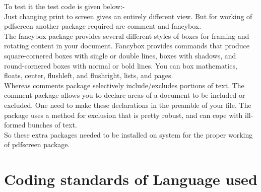 \noindent To test it the test code is given below:-\\
Just changing print to screen gives an entirely different view. But for working of pdfscreen another package required are comment and fancybox.\\

\noindent The fancybox package provides several different styles of boxes for framing and rotating content in your document. Fancybox provides commands that produce square-cornered boxes with single or double lines, boxes with shadows, and round-cornered boxes with normal or bold lines. You can box mathematics, floats, center, flushleft, and flushright, lists, and pages.\\
 	
\noindent Whereas comments package selectively include/excludes portions of text. The comment package allows you to declare areas of a document to be included or excluded. One need to make these declarations in the preamble of your file. The package uses a method for exclusion that is pretty robust, and can cope with ill-formed bunches of text.\\

\noindent So these extra packages needed to be installed on system for the proper working of pdfscreen package.


	\section{Coding standards of Language used 
}

